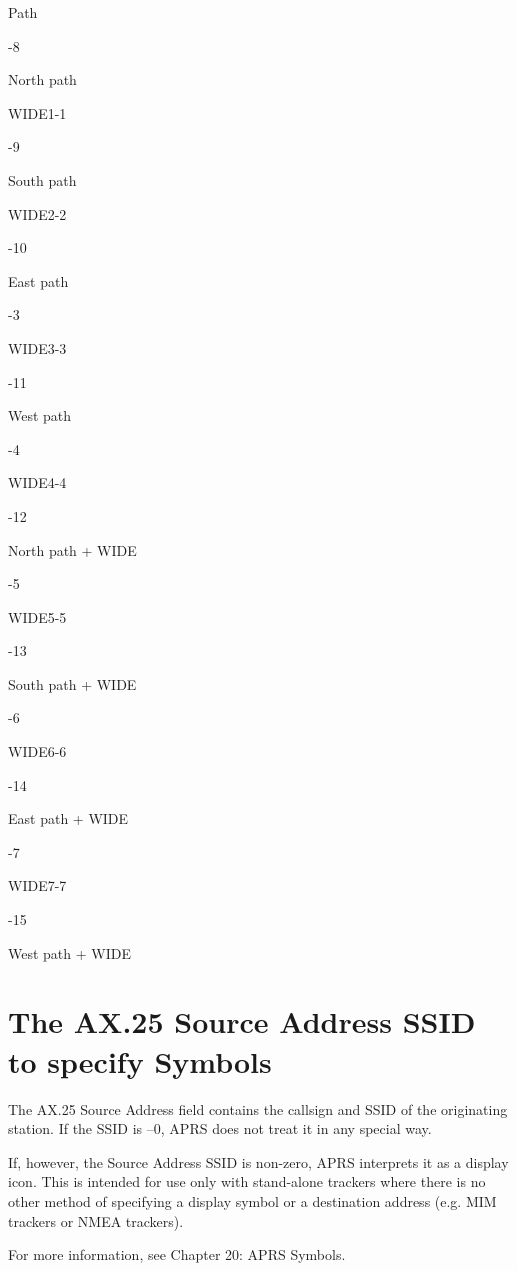 Path

-8

North path

WIDE1-1

-9

South path

WIDE2-2

-10

East path

-3

WIDE3-3

-11

West path

-4

WIDE4-4

-12

North path + WIDE

-5

WIDE5-5

-13

South path + WIDE

-6

WIDE6-6

-14

East path + WIDE

-7

WIDE7-7

-15

West path + WIDE


\section{The AX.25 Source Address SSID to specify Symbols}

The AX.25 Source Address field contains the callsign and SSID of the
originating station. If the SSID is –0, APRS does not treat it in any special
way.

If, however, the Source Address SSID is non-zero, APRS interprets it as a
display icon. This is intended for use only with stand-alone trackers where
there is no other method of specifying a display symbol or a destination
address (e.g. MIM trackers or NMEA trackers).

For more information, see Chapter 20: APRS Symbols.
